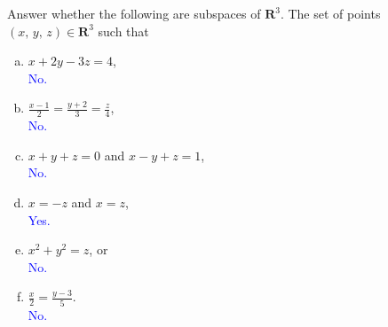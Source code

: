 \documentclass[a4paper,11pt]{article}
\newcommand{\R}{\mathbf{R}}
\newcommand{\BB}[1]{\textcolor{blue}{#1}}
\begin{document}
 Answer whether the following are subspaces of
$\R^3$. The set of points $(x,\,y,\,z) \in \R^3$ such that
\begin{enumerate}[(a)]
\item $x+2y-3z=4$, \\

  \BB{No. \\}

\item $\frac{x-1}{2}=\frac{y+2}{3}=\frac{z}{4}$, \\

  \BB{No. \\}
  
\item $x+y+z=0$ and $x-y+z=1$, \\

  \BB{No. \\}
  
\item $x=-z$ and $x=z$, \\

  \BB{Yes. \\}

\item $x^2+y^2=z$, or \\

  \BB{No. \\}
  
\item $\frac{x}{2} = \frac{y-3}{5}$. \\

  \BB{No. \\}
\end{enumerate}
\end{document}
